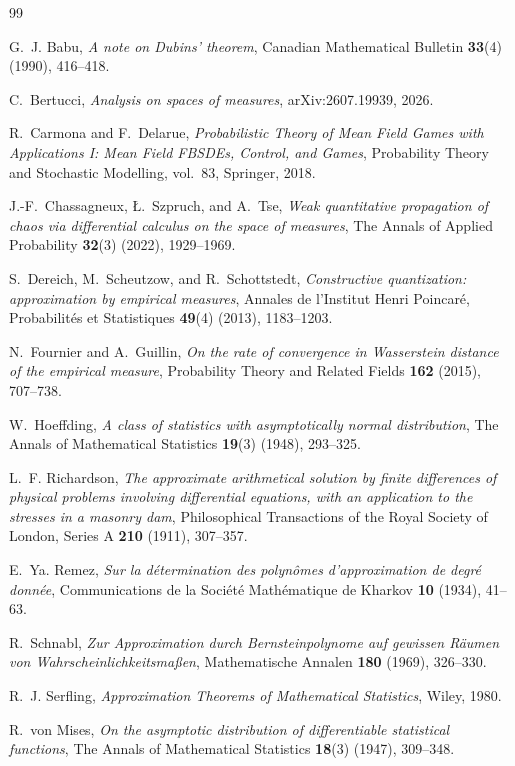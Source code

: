 \documentclass[11pt]{article}
\begin{document}
\begin{thebibliography}{99}

G.~J. Babu,
\emph{A note on Dubins' theorem},
Canadian Mathematical Bulletin \textbf{33}(4) (1990), 416--418.

C.~Bertucci,
\emph{Analysis on spaces of measures},
arXiv:2607.19939, 2026.

R.~Carmona and F.~Delarue,
\emph{Probabilistic Theory of Mean Field Games with Applications I:
Mean Field FBSDEs, Control, and Games},
Probability Theory and Stochastic Modelling, vol.~83, Springer, 2018.

J.-F.~Chassagneux, {\L}.~Szpruch, and A.~Tse,
\emph{Weak quantitative propagation of chaos via differential calculus
on the space of measures},
The Annals of Applied Probability \textbf{32}(3) (2022), 1929--1969.

S.~Dereich, M.~Scheutzow, and R.~Schottstedt,
\emph{Constructive quantization: approximation by empirical measures},
Annales de l'Institut Henri Poincaré, Probabilités et Statistiques
\textbf{49}(4) (2013), 1183--1203.

N.~Fournier and A.~Guillin,
\emph{On the rate of convergence in Wasserstein distance of the
empirical measure},
Probability Theory and Related Fields \textbf{162} (2015), 707--738.

W.~Hoeffding,
\emph{A class of statistics with asymptotically normal distribution},
The Annals of Mathematical Statistics \textbf{19}(3) (1948), 293--325.

L.~F. Richardson,
\emph{The approximate arithmetical solution by finite differences of
physical problems involving differential equations, with an application
to the stresses in a masonry dam},
Philosophical Transactions of the Royal Society of London, Series A
\textbf{210} (1911), 307--357.

E.~Ya. Remez,
\emph{Sur la détermination des polynômes d'approximation de degré
donnée},
Communications de la Société Mathématique de Kharkov \textbf{10} (1934),
41--63.

R.~Schnabl,
\emph{Zur Approximation durch Bernsteinpolynome auf gewissen Räumen von
Wahrscheinlichkeitsmaßen},
Mathematische Annalen \textbf{180} (1969), 326--330.

R.~J. Serfling,
\emph{Approximation Theorems of Mathematical Statistics},
Wiley, 1980.

R.~von Mises,
\emph{On the asymptotic distribution of differentiable statistical
functions},
The Annals of Mathematical Statistics \textbf{18}(3) (1947), 309--348.

\end{thebibliography}
\end{document}
